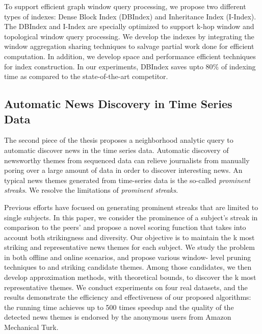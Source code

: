 To support efficient graph window query processing, we propose
two different types of indexes: Dense Block Index (DBIndex)
and Inheritance Index (I-Index). The DBIndex and I-Index
are specially optimized to support k-hop window and topological
window query processing. We develop the indexes
by integrating the window aggregation sharing techniques
to salvage partial work done for efficient computation. 
In addition, we develop space and performance efficient techniques
for index construction. In our experiments, DBIndex saves upto 80\%
of indexing time as compared to the state-of-the-art competitor.


\subsection{Automatic News Discovery in Time Series Data}
The second piece of the thesis proposes a neighborhood analytic
query to automatic discover news in the time series data.
Automatic discovery of newsworthy themes from sequenced
data can relieve journalists from manually poring over a
large amount of data in order to discover interesting news.
An typical news themes generated from time-series data
is the so-called \emph{prominent streaks}. We resolve the limitations
of \emph{prominent streaks}.

Previous efforts have focused on generating prominent streaks
that are limited to single subjects. In this paper, we consider 
the prominence of a subject's streak in comparison to
the peers' and propose a novel scoring function that takes
into account both strikingness and diversity. Our objective
is to maintain the k most striking and representative news
themes for each subject. We study the problem in both
offline and online scenarios, and propose various window-
level pruning techniques to and striking candidate themes.
Among those candidates, we then develop approximation
methods, with theoretical bounds, to discover the k most
representative themes. We conduct experiments on four real
datasets, and the results demonstrate the efficiency and 
effectiveness of our proposed algorithms: the running time
achieves up to 500 times speedup and the quality of the
detected news themes is endorsed by the anonymous users
from Amazon Mechanical Turk.

